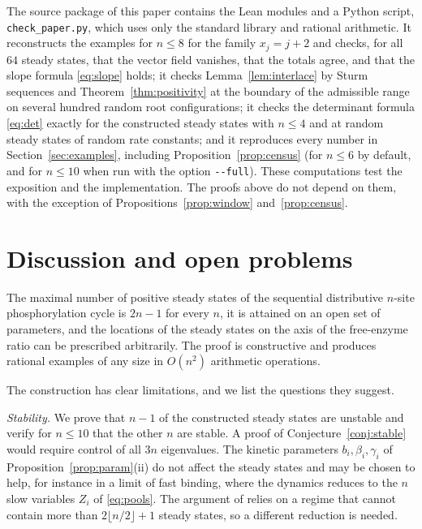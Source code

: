 \documentclass[11pt]{article}
\theoremstyle{plain}
\theoremstyle{definition}
\theoremstyle{remark}
\numberwithin{equation}{section}
\begin{document}
{\sloppy The source package of this paper contains the Lean modules and a Python script,
\texttt{check\_paper.py}, which uses only the standard library and rational arithmetic. It
reconstructs the examples for \(n\le8\) for the family \(x_j=j+2\) and checks, for all \(64\)
steady states, that the vector field vanishes, that the totals agree, and that the slope
formula \eqref{eq:slope} holds; it checks Lemma~\ref{lem:interlace} by Sturm sequences and
Theorem~\ref{thm:positivity} at the boundary of the admissible range on several hundred
random root configurations; it checks the determinant formula \eqref{eq:det} exactly for the
constructed steady states with \(n\le4\) and at random steady states of random rate
constants; and it reproduces every number in Section~\ref{sec:examples}, including
Proposition~\ref{prop:census} (for \(n\le6\) by default, and for \(n\le10\) when run with
the option \texttt{-{}-full}). These computations test the exposition and the implementation. The proofs
above do not depend on them, with the exception of Propositions~\ref{prop:window}
and~\ref{prop:census}.\par}

\section{Discussion and open problems}\label{sec:discussion}
The maximal number of positive steady states of the sequential distributive \(n\)-site
phosphorylation cycle is \(2n-1\) for every \(n\), it is attained on an open set of
parameters, and the locations of the steady states on the axis of the free-enzyme ratio can
be prescribed arbitrarily. The proof is constructive and produces rational examples of any
size in \(O(n^2)\) arithmetic operations.

The construction has clear limitations, and we list the questions they suggest.

\emph{Stability.} We prove that \(n-1\) of the constructed steady states are unstable and
verify for \(n\le10\) that the other \(n\) are stable. A proof of
Conjecture~\ref{conj:stable} would require control of all \(3n\) eigenvalues. The kinetic
parameters \(b_i,\beta_i,\gamma_i\) of Proposition~\ref{prop:param}(ii) do not affect the
steady states and may be chosen to help, for instance in a limit of fast binding, where the
dynamics reduces to the \(n\) slow variables \(Z_i\) of \eqref{eq:pools}. The argument of
\cite{FRW2020} relies on a regime that cannot contain more than \(2\lfloor n/2\rfloor+1\)
steady states, so a different reduction is needed.
\end{document}
